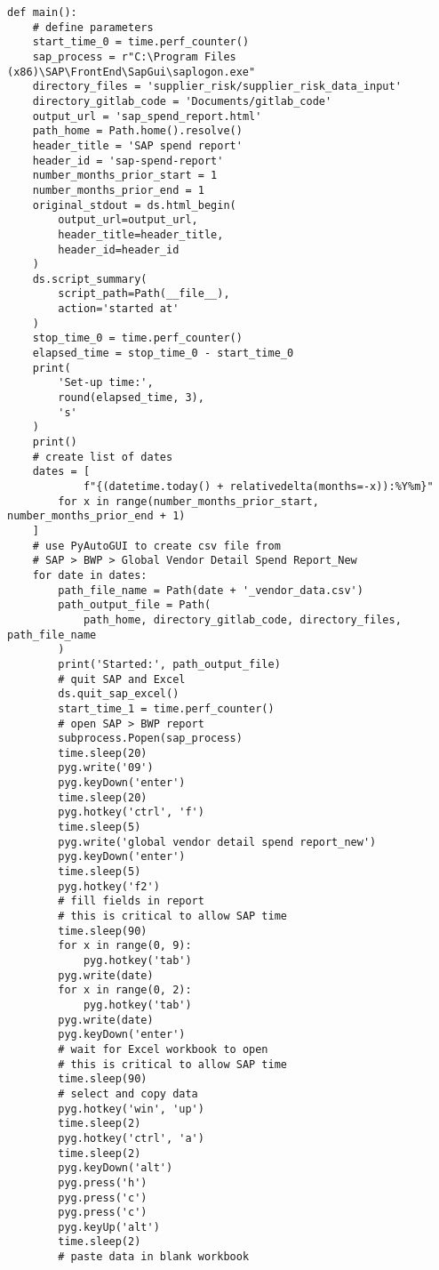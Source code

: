 \documentclass[10pt, letterpaper, twoside]{article}
\begin{document}
\begin{footnotesize}
\begin{verbatim}
def main():
    # define parameters
    start_time_0 = time.perf_counter()
    sap_process = r"C:\Program Files (x86)\SAP\FrontEnd\SapGui\saplogon.exe"
    directory_files = 'supplier_risk/supplier_risk_data_input'
    directory_gitlab_code = 'Documents/gitlab_code'
    output_url = 'sap_spend_report.html'
    path_home = Path.home().resolve()
    header_title = 'SAP spend report'
    header_id = 'sap-spend-report'
    number_months_prior_start = 1
    number_months_prior_end = 1
    original_stdout = ds.html_begin(
        output_url=output_url,
        header_title=header_title,
        header_id=header_id
    )
    ds.script_summary(
        script_path=Path(__file__),
        action='started at'
    )
    stop_time_0 = time.perf_counter()
    elapsed_time = stop_time_0 - start_time_0
    print(
        'Set-up time:',
        round(elapsed_time, 3),
        's'
    )
    print()
    # create list of dates
    dates = [
            f"{(datetime.today() + relativedelta(months=-x)):%Y%m}"
        for x in range(number_months_prior_start, number_months_prior_end + 1)
    ]
    # use PyAutoGUI to create csv file from
    # SAP > BWP > Global Vendor Detail Spend Report_New
    for date in dates:
        path_file_name = Path(date + '_vendor_data.csv')
        path_output_file = Path(
            path_home, directory_gitlab_code, directory_files, path_file_name
        )
        print('Started:', path_output_file)
        # quit SAP and Excel
        ds.quit_sap_excel()
        start_time_1 = time.perf_counter()
        # open SAP > BWP report
        subprocess.Popen(sap_process)
        time.sleep(20)
        pyg.write('09')
        pyg.keyDown('enter')
        time.sleep(20)
        pyg.hotkey('ctrl', 'f')
        time.sleep(5)
        pyg.write('global vendor detail spend report_new')
        pyg.keyDown('enter')
        time.sleep(5)
        pyg.hotkey('f2')
        # fill fields in report
        # this is critical to allow SAP time
        time.sleep(90)
        for x in range(0, 9):
            pyg.hotkey('tab')
        pyg.write(date)
        for x in range(0, 2):
            pyg.hotkey('tab')
        pyg.write(date)
        pyg.keyDown('enter')
        # wait for Excel workbook to open
        # this is critical to allow SAP time
        time.sleep(90)
        # select and copy data
        pyg.hotkey('win', 'up')
        time.sleep(2)
        pyg.hotkey('ctrl', 'a')
        time.sleep(2)
        pyg.keyDown('alt')
        pyg.press('h')
        pyg.press('c')
        pyg.press('c')
        pyg.keyUp('alt')
        time.sleep(2)
        # paste data in blank workbook

\end{verbatim}
\end{footnotesize}
\end{document}
